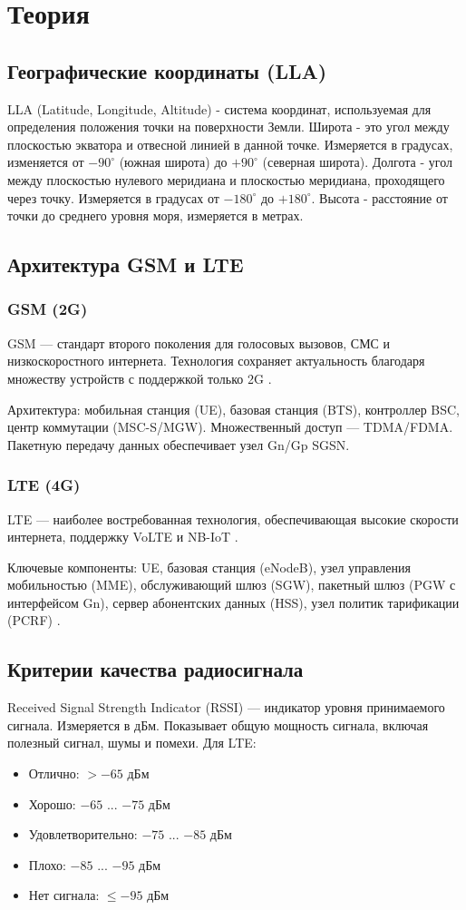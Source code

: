 \chapter{Теория}
\label{ch:theory}
\section{Географические координаты (LLA)}
LLA (Latitude, Longitude, Altitude) - система координат, используемая для определения положения точки на поверхности Земли. Широта - это угол между плоскостью экватора и отвесной линией в данной точке. Измеряется в градусах, изменяется от $-90^{\circ}$ (южная широта) до $+90^{\circ}$ (северная широта). Долгота - угол между плоскостью нулевого меридиана и плоскостью меридиана, проходящего через точку. Измеряется в градусах от $-180^{\circ}$ до $+180^{\circ}$. Высота - расстояние от точки до среднего уровня моря, измеряется в метрах. \cite{lla}

\section{Архитектура GSM и LTE}
\subsection{GSM (2G)}
GSM — стандарт второго поколения для голосовых вызовов, СМС и низкоскоростного интернета. Технология сохраняет актуальность благодаря множеству устройств с поддержкой только 2G \cite{gsm_lte}.

Архитектура: мобильная станция (UE), базовая станция (BTS), контроллер BSC, центр коммутации (MSC-S/MGW). Множественный доступ — TDMA/FDMA. Пакетную передачу данных обеспечивает узел Gn/Gp SGSN.


\subsection{LTE (4G)}
LTE — наиболее востребованная технология, обеспечивающая высокие скорости интернета, поддержку VoLTE и NB-IoT \cite{gsm_lte}.

Ключевые компоненты: UE, базовая станция (eNodeB), узел управления мобильностью (MME), обслуживающий шлюз (SGW), пакетный шлюз (PGW с интерфейсом Gn), сервер абонентских данных (HSS), узел политик тарификации (PCRF) \cite{gsm_lte}.


\section{Критерии качества радиосигнала}
Received Signal Strength Indicator (RSSI) — индикатор уровня принимаемого сигнала. Измеряется в дБм. Показывает общую мощность сигнала, включая полезный сигнал, шумы и помехи. Для LTE:  \cite{rssi}
\begin{itemize}
    \item Отлично: $> -65$ дБм
    \item Хорошо: $-65$ ... $-75$ дБм
    \item Удовлетворительно: $-75$ ... $-85$ дБм
    \item Плохо: $-85$ ... $-95$ дБм
    \item Нет сигнала: $\leq -95$ дБм
\end{itemize}

